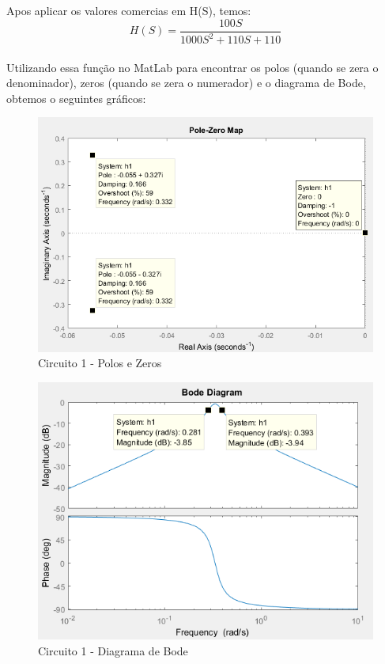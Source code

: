 \documentclass[a4paper, 12pt]{article}
\begin{document}
			Apos aplicar os valores comercias em H(S), temos:
			\[
			H(S) = \frac{100S}{1000S^{2} + 110S + 110}
			\] 	\\

			Utilizando essa função no MatLab para encontrar os polos (quando se zera o denominador), zeros (quando se zera o numerador) e o diagrama de Bode, obtemos o seguintes gráficos:

			\begin{figure}[!ht]
				\centering
				\includegraphics[scale=0.7]{img/1e_circ1.png}
				\caption{Circuito 1 - Polos e Zeros}
			\end{figure}

			\begin{figure}[!ht]
				\centering
				\includegraphics[scale=0.9]{img/1f_circ1.png}
				\caption{Circuito 1 - Diagrama de Bode}
			\end{figure}
\end{document}
